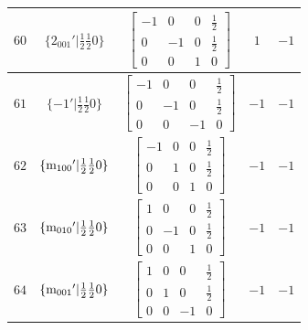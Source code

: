\documentclass[fleqn,8pt]{jsarticle}
\begin{document}
\begin{longtable}{ccccc}
$ 60 $ & $ \{2{}_{001}{}'|\frac{1}{2} \frac{1}{2} 0\} $ & $ \begin{bmatrix} -1 & 0 & 0 & \frac{1}{2} \\ 0 & -1 & 0 & \frac{1}{2} \\ 0 & 0 & 1 & 0 \end{bmatrix} $ & $ 1 $ & $ -1 $ \\ \hline
$ 61 $ & $ \{-1{}'|\frac{1}{2} \frac{1}{2} 0\} $ & $ \begin{bmatrix} -1 & 0 & 0 & \frac{1}{2} \\ 0 & -1 & 0 & \frac{1}{2} \\ 0 & 0 & -1 & 0 \end{bmatrix} $ & $ -1 $ & $ -1 $ \\ \hline
$ 62 $ & $ \{{\rm m}_{100}{}'|\frac{1}{2} \frac{1}{2} 0\} $ & $ \begin{bmatrix} -1 & 0 & 0 & \frac{1}{2} \\ 0 & 1 & 0 & \frac{1}{2} \\ 0 & 0 & 1 & 0 \end{bmatrix} $ & $ -1 $ & $ -1 $ \\ \hline
$ 63 $ & $ \{{\rm m}_{010}{}'|\frac{1}{2} \frac{1}{2} 0\} $ & $ \begin{bmatrix} 1 & 0 & 0 & \frac{1}{2} \\ 0 & -1 & 0 & \frac{1}{2} \\ 0 & 0 & 1 & 0 \end{bmatrix} $ & $ -1 $ & $ -1 $ \\ \hline
$ 64 $ & $ \{{\rm m}_{001}{}'|\frac{1}{2} \frac{1}{2} 0\} $ & $ \begin{bmatrix} 1 & 0 & 0 & \frac{1}{2} \\ 0 & 1 & 0 & \frac{1}{2} \\ 0 & 0 & -1 & 0 \end{bmatrix} $ & $ -1 $ & $ -1 $ \\
\end{longtable}
\end{document}
